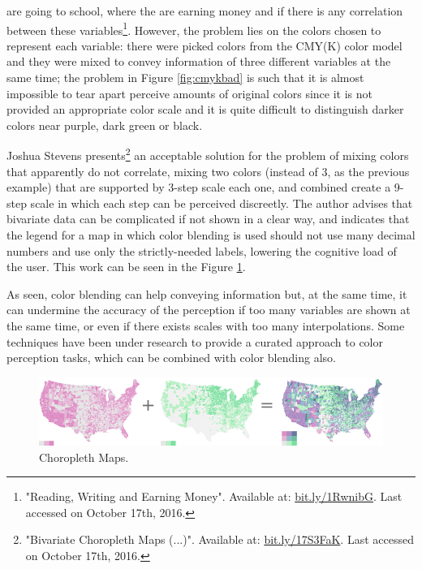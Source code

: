 are going to school, where the are earning money and if there is any correlation between these variables\footnote{"Reading,
Writing and Earning Money". Available at: \url{bit.ly/1RwnibG}.
Last accessed on October 17th, 2016.}. However, the problem lies on the colors chosen to represent each variable: there were picked
colors from the CMY(K) color model and they
were mixed to convey information of three different variables at the same time; the problem in Figure \ref{fig:cmykbad} is such that
it is almost impossible to tear apart perceive amounts of original colors since it is not provided an appropriate color
scale and it is quite difficult to distinguish darker colors near purple, dark green or black. \par
Joshua Stevens presents\footnote{"Bivariate Choropleth Maps (...)". Available at:
\url{bit.ly/17S3FaK}. Last accessed on October 17th, 2016.} an acceptable
solution for the problem of mixing colors that apparently do not correlate, mixing two colors (instead of 3, as the
previous example) that are supported by 3-step scale each one, and combined create a 9-step scale in which each step
can be perceived discreetly. The author advises that bivariate data can be complicated if not shown in a clear
way, and indicates that the legend for a map in which color blending is used should not use many decimal numbers and use
only the strictly-needed labels, lowering the cognitive load of the user. This work can be seen in the Figure \ref{fig:choropleth}.\\
\par
As seen, color blending can help conveying information but, at the same time, it can undermine the accuracy of
the perception if too many variables are shown at the same time, or even if there exists scales with too many
interpolations. Some techniques have been under research to provide a curated approach to color perception
tasks, which can be combined with color blending also.
%
\begin{figure}[H]
	\centering
    \vspace{-5pt}
    \includegraphics[width=\textwidth]{images/background/js_choroMath.png}
    \caption[Bivariate Choropleth Maps]{Choropleth Maps.\protect\footnotemark[30]}
    \vspace{-10pt}
    \label{fig:choropleth}
\end{figure}
%
